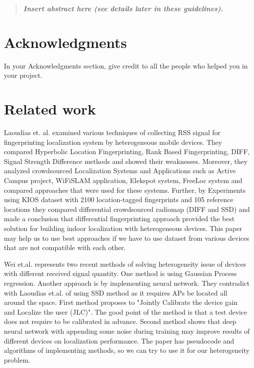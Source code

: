 \documentclass[]{final_report}
\begin{document}
\maketitle

\tableofcontents
\newpage


\begin{abstract}

\textbf{\textsl{Insert abstract here (see details later in these guidelines).}}

\end{abstract}
\newpage


\chapter*{Acknowledgments}

In your Acknowledgments section, give credit to all the people who helped you in your project.


\chapter{Related work}
Laoudias et. al. \cite{Laoudia:2013} examined various techniques of collecting RSS signal for fingerprinting localization system by heterogeneous mobile devices. They compared Hyperbolic Location Fingerprinting, Rank Based Fingerprinting, DIFF, Signal Strength Difference methods and showed their weaknesses. Moreover, they analyzed crowdsourced Localization Systems and Applications such as Active Campus project, WiFiSLAM application, Elekspot system, FreeLoc system and compared approaches that were used for these systems. Further, by Experiments using KIOS dataset with 2100 location-tagged fingerprints and 105 reference locations they compared differential crowdsourced radiomap (DIFF and SSD) and made a conclusion that differential fingerprinting approach provided the best solution for building indoor localization with heterogeneous devices. This paper may help us to use best approaches if we have to use dataset from various devices that are not compatible with each other.

Wei et.al. \cite{Yongyong:2020} represents two recent methods of solving heterogeneity issue of devices with different received signal quantity. One method is using Gaussian Process regression. Another approach is by implementing neural network. They contradict with Laoudias et.al. of using SSD method as it requires APs be located all around the space. First method proposes to "Jointly Calibrate the device gain and Localize the user (JLC)". The good point of the method is that a test device does not require to be calibrated in advance. Second method shows that deep neural network with appending some noise during training may improve results of different devices on localization performance. The paper has pseudocode and algorithms of implementing methods, so we can try to use it for our heterogeneity problem.
\end{document}

